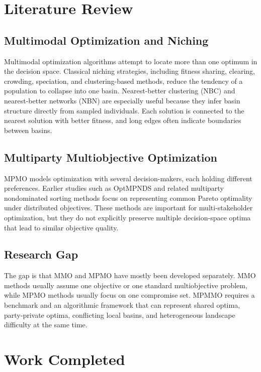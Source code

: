 \documentclass[12pt,a4paper]{article}
\begin{document}
\section{Literature Review}

\subsection{Multimodal Optimization and Niching}

Multimodal optimization algorithms attempt to locate more than one optimum in the
decision space. Classical niching strategies, including fitness sharing, clearing, crowding,
speciation, and clustering-based methods, reduce the tendency of a population to collapse
into one basin. Nearest-better clustering (NBC) and nearest-better networks (NBN) are
especially useful because they infer basin structure directly from sampled individuals.
Each solution is connected to the nearest solution with better fitness, and long edges
often indicate boundaries between basins.

\subsection{Multiparty Multiobjective Optimization}

MPMO models optimization with several decision-makers, each holding different
preferences. Earlier studies such as OptMPNDS and related multiparty nondominated
sorting methods focus on representing common Pareto optimality under distributed
objectives. These methods are important for multi-stakeholder optimization, but they do
not explicitly preserve multiple decision-space optima that lead to similar objective
quality.

\subsection{Research Gap}

The gap is that MMO and MPMO have mostly been developed separately. MMO methods
usually assume one objective or one standard multiobjective problem, while MPMO
methods usually focus on one compromise set. MPMMO requires a benchmark and an
algorithmic framework that can represent shared optima, party-private optima, conflicting
local basins, and heterogeneous landscape difficulty at the same time.

\section{Work Completed}
\end{document}
